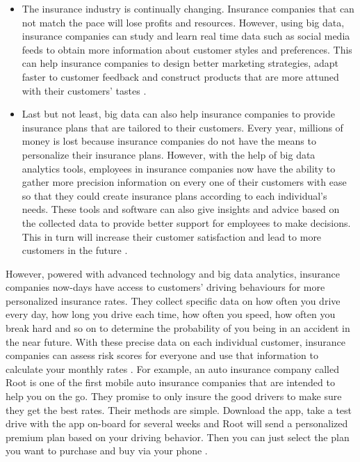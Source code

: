 \begin{itemize}
    \item The insurance industry is continually changing. Insurance companies that can not match the pace will lose profits and resources. However, using big data, insurance companies can study and learn real time data such as social media feeds to obtain more information about customer styles and preferences. This can help insurance companies to design better marketing strategies, adapt faster to customer feedback and construct products that are more attuned with their customers' tastes \cite{Cordray2015data}.
    
    \item Last but not least, big data can also help insurance companies to provide insurance plans that are tailored to their customers. Every year, millions of money is lost because insurance companies do not have the means to personalize their insurance plans. However, with the help of big data analytics tools, employees in insurance companies now have the ability to gather more precision information on every one of their customers with ease so that they could create insurance plans according to each individual's needs. These tools and software can also give insights and advice based on the collected data to provide better support for employees to make decisions. This in turn will increase their customer satisfaction and lead to more customers in the future \cite{Cordray2015data}.

\end{itemize}

However, powered with advanced technology and big data analytics, insurance companies now-days have access to customers' driving behaviours for more personalized insurance rates. They collect specific data on how often you drive every day, how long you drive each time, how often you speed, how often you break hard and so on to determine the probability of you being in an accident in the near future. With these precise data on each individual customer, insurance companies can assess risk scores for everyone and use that information to calculate your monthly rates \cite{Fung2016turn}. For example, an auto insurance company called Root is one of the first mobile auto insurance companies that are intended to help you on the go. They promise to only insure the good drivers to make sure they get the best rates. Their methods are simple. Download the app, take a test drive with the app on-board for several weeks and Root will send a personalized premium plan based on your driving behavior. Then you can just select the plan you want to purchase and buy via your phone \cite{Rippe2017unfair}.

